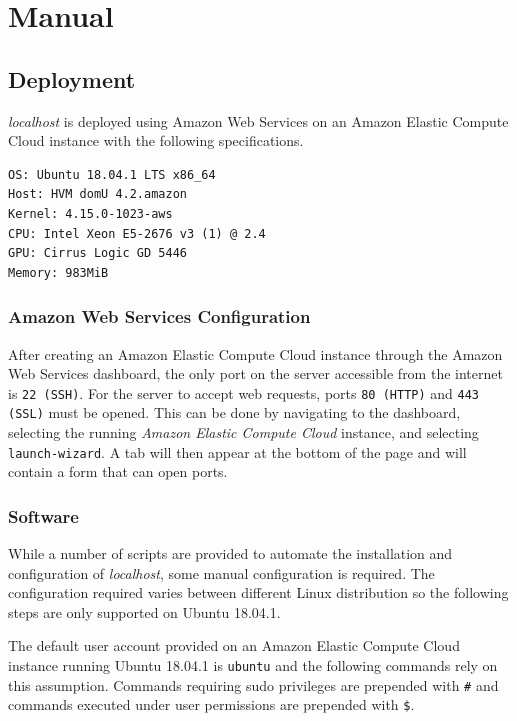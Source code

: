 \section{Manual}
\subsection{Deployment}

\emph{localhost} is deployed using Amazon Web Services on an Amazon Elastic
Compute Cloud instance with the following specifications.
\begin{lstlisting}
OS: Ubuntu 18.04.1 LTS x86_64
Host: HVM domU 4.2.amazon
Kernel: 4.15.0-1023-aws
CPU: Intel Xeon E5-2676 v3 (1) @ 2.4
GPU: Cirrus Logic GD 5446
Memory: 983MiB
\end{lstlisting}

\subsubsection{Amazon Web Services Configuration}

After creating an Amazon Elastic Compute Cloud instance through the Amazon Web
Services dashboard, the only port on the server accessible from the internet
is \lstinline{22 (SSH)}. For the server to accept web requests, ports
\lstinline{80 (HTTP)} and \lstinline{443 (SSL)} must be opened. This can be
done by navigating to the dashboard, selecting the running
\emph{Amazon Elastic Compute Cloud} instance, and selecting
\lstinline{launch-wizard}. A tab will then appear at the bottom of the page
and will contain a form that can open ports.

\subsubsection{Software}

While a number of scripts are provided to automate the installation and
configuration of \emph{localhost}, some manual configuration is required.
The configuration required varies between different Linux distribution so the
following steps are only supported on Ubuntu 18.04.1.

The default user account provided on an Amazon Elastic Compute Cloud instance
running Ubuntu 18.04.1 is \lstinline{ubuntu} and the following commands rely on
this assumption. Commands requiring sudo privileges are prepended with
\lstinline{#} and commands executed under user permissions are prepended with
\lstinline{$}.

